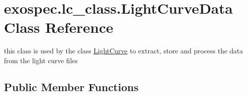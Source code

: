 \hypertarget{classexospec_1_1lc__class_1_1_light_curve_data}{}\section{exospec.\+lc\+\_\+class.\+Light\+Curve\+Data Class Reference}
\label{classexospec_1_1lc__class_1_1_light_curve_data}


this class is used by the class \hyperlink{classexospec_1_1lc__class_1_1_light_curve}{Light\+Curve} to extract, store and process the data from the light curve files  


\subsection*{Public Member Functions}
